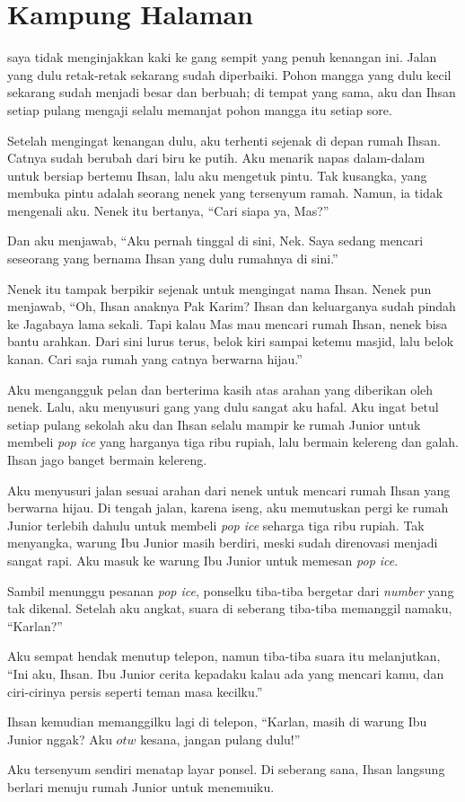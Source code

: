 \chapter*{Kampung Halaman}


 saya tidak menginjakkan kaki ke gang sempit yang penuh kenangan ini. Jalan yang dulu retak-retak sekarang sudah diperbaiki. Pohon mangga yang dulu kecil sekarang sudah menjadi besar dan berbuah; di tempat yang sama, aku dan Ihsan setiap pulang mengaji selalu memanjat pohon mangga itu setiap sore. 

Setelah mengingat kenangan dulu, aku terhenti sejenak di depan rumah Ihsan. Catnya sudah berubah dari biru ke putih. Aku menarik napas dalam-dalam untuk bersiap bertemu Ihsan, lalu aku mengetuk pintu. Tak kusangka, yang membuka pintu adalah seorang nenek yang tersenyum ramah. Namun, ia tidak mengenali aku. Nenek itu bertanya, ``Cari siapa ya, Mas?'' 

Dan aku menjawab, ``Aku pernah tinggal di sini, Nek. Saya sedang mencari seseorang yang bernama Ihsan yang dulu rumahnya di sini.''

Nenek itu tampak berpikir sejenak untuk mengingat nama Ihsan. Nenek pun menjawab, ``Oh, Ihsan anaknya Pak Karim? Ihsan dan keluarganya sudah pindah ke Jagabaya lama sekali. Tapi kalau Mas mau mencari rumah Ihsan, nenek bisa bantu arahkan. Dari sini lurus terus, belok kiri sampai ketemu masjid, lalu belok kanan. Cari saja rumah yang catnya berwarna hijau.''

Aku mengangguk pelan dan berterima kasih atas arahan yang diberikan oleh nenek. Lalu, aku menyusuri gang yang dulu sangat aku hafal. Aku ingat betul setiap pulang sekolah aku dan Ihsan selalu mampir ke rumah Junior untuk membeli \textit{pop ice} yang harganya tiga ribu rupiah, lalu bermain kelereng dan galah. Ihsan jago banget bermain kelereng.

Aku menyusuri jalan sesuai arahan dari nenek untuk mencari rumah Ihsan yang berwarna hijau. Di tengah jalan, karena iseng, aku memutuskan pergi ke rumah Junior terlebih dahulu untuk membeli \textit{pop ice} seharga tiga ribu rupiah. Tak menyangka, warung Ibu Junior masih berdiri, meski sudah direnovasi menjadi sangat rapi. Aku masuk ke warung Ibu Junior untuk memesan \textit{pop ice}. 

Sambil menunggu pesanan \textit{pop ice}, ponselku tiba-tiba bergetar dari \textit{number} yang tak dikenal. Setelah aku angkat, suara di seberang tiba-tiba memanggil namaku, ``Karlan?''

Aku sempat hendak menutup telepon, namun tiba-tiba suara itu melanjutkan, ``Ini aku, Ihsan. Ibu Junior cerita kepadaku kalau ada yang mencari kamu, dan ciri-cirinya persis seperti teman masa kecilku.'' 

Ihsan kemudian memanggilku lagi di telepon, ``Karlan, masih di warung Ibu Junior nggak? Aku \(\textit{otw}\) kesana, jangan pulang dulu!''

Aku tersenyum sendiri menatap layar ponsel. Di seberang sana, Ihsan langsung berlari menuju rumah Junior untuk menemuiku.

\jedahias
